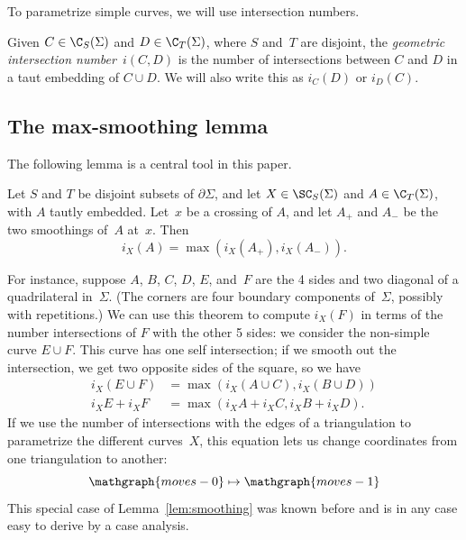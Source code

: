 To parametrize simple curves, we will use intersection numbers.
\begin{definition}\label{def:intersection}
  Given $C\in \C_S(\Sigma)$ and $D\in \C_T(\Sigma)$, where $S$ and~$T$ are
  disjoint, the \emph{geometric intersection number}~$i(C,D)$ is the number of
  intersections between $C$ and $D$ in a taut embedding of $C \cup D$.
  We will also write this as $i_C(D)$ or $i_D(C)$.
\end{definition}
  
 \subsection{The max-smoothing lemma}
 
 The following lemma is a central tool in this paper.

\begin{lemma}\label{lem:smoothing}
  Let $S$ and $T$ be disjoint subsets of $\partial \Sigma$,  and let $X \in \SC_S(\Sigma)$
  and $A \in \C_T(\Sigma)$, with $A$ tautly embedded.  Let~$x$ be a crossing of 
  $A$, and let $A_+$ and $A_-$ be the two smoothings of~$A$ at~$x$.  Then
  \[
  i_X(A) = \max(i_X(A_+), i_X(A_-)).
  \]
  \label{lem:maxsmoothing}
\end{lemma}

For instance, suppose $A$, $B$, $C$, $D$, $E$, and~$F$ are the 4 sides
and two diagonal of a quadrilateral in~$\Sigma$.  (The corners are four
boundary components of~$\Sigma$, possibly with repetitions.)  We can use
this theorem to compute $i_X(F)$ in terms of the number intersections
of $F$ with the other 5 sides: we consider the non-simple curve $E \cup
F$.  This curve has one self intersection; if we smooth out the
intersection, we get two opposite sides of the square, so we have
\begin{align*}
i_X(E \cup F) &= \max(i_X(A \cup C),i_X(B \cup D))\\
i_X E + i_X F &= \max(i_X A + i_X C, i_X B + i_X D).
\end{align*}
If we use the number of intersections with the edges of a
triangulation to parametrize the different curves~$X$, this equation
lets us change coordinates from one triangulation to another:
\[
\mathgraph{moves-0} \mapsto \mathgraph{moves-1}
\]
This special case of Lemma~\ref{lem:smoothing} was known before
and is in any case easy to derive by a case analysis.

